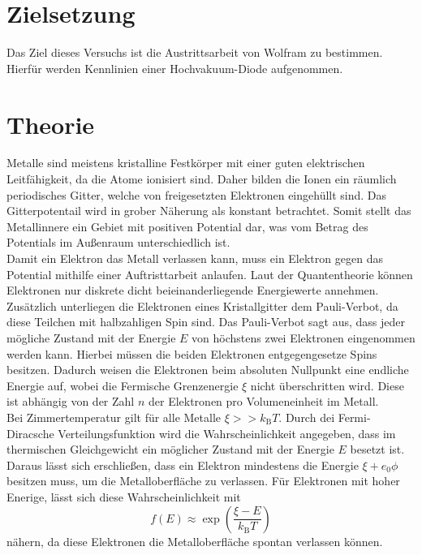 \nocite{anleitungV504}
\section{Zielsetzung}
\label{sec:Zielsetzung}
Das Ziel dieses Versuchs ist die Austrittsarbeit von Wolfram zu bestimmen. Hierfür werden Kennlinien einer Hochvakuum-Diode aufgenommen. 

\section{Theorie}
\label{sec:Theorie}
Metalle sind meistens kristalline Festkörper mit einer guten elektrischen Leitfähigkeit, 
da die Atome ionisiert sind. Daher bilden die Ionen ein räumlich periodisches Gitter, welche von
freigesetzten Elektronen eingehüllt sind. Das Gitterpotentail wird in grober Näherung als konstant betrachtet.
Somit stellt das Metallinnere ein Gebiet mit positiven Potential dar, was vom Betrag des Potentials im Außenraum 
unterschiedlich ist.\\
Damit ein Elektron das Metall verlassen kann, muss ein Elektron gegen das Potential mithilfe einer
Auftristtarbeit anlaufen. Laut der Quantentheorie können Elektronen nur diskrete dicht beieinanderliegende Energiewerte 
annehmen. Zusätzlich unterliegen die Elektronen eines Kristallgitter dem Pauli-Verbot, da diese Teilchen mit halbzahligen Spin
sind. Das Pauli-Verbot sagt aus, dass jeder mögliche Zustand mit der Energie 
$E$ von höchstens zwei Elektronen eingenommen werden kann. Hierbei müssen die beiden Elektronen entgegengesetze Spins besitzen.
Dadurch weisen die Elektronen beim absoluten Nullpunkt eine endliche Energie auf, wobei die Fermische Grenzenergie $\xi$ nicht überschritten
wird. Diese ist abhängig von der Zahl $n$ der Elektronen pro Volumeneinheit im Metall.
\\
Bei Zimmertemperatur gilt für alle Metalle $\xi >> k_{\text{B}}T$. Durch dei Fermi-Diracsche Verteilungsfunktion
wird die Wahrscheinlichkeit angegeben, dass im thermischen Gleichgewicht ein möglicher Zustand mit der Energie $E$ besetzt ist. 
Daraus lässt sich erschließen, dass ein Elektron mindestens die Energie $\xi + e_0 \phi$ besitzen muss, um die Metalloberfläche zu verlassen.
Für Elektronen mit hoher Enerige, lässt sich diese Wahrscheinlichkeit mit 
\begin{equation}
    f(E)\approx \exp\left( \frac{\xi - E}{k_{\text{B}}T}\right)
    \label{eqn:Wahrscheinlichkeit_hoheEnergie}
\end{equation}
nähern, da diese Elektronen die Metalloberfläche spontan verlassen können.

